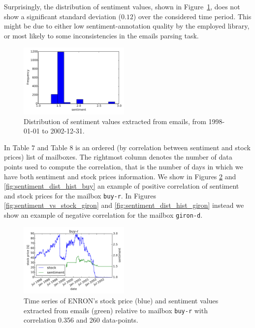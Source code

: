 \documentclass{vldb}
\begin{document}
Surprisingly, the distribution of sentiment values, shown in Figure~\ref{fig:sentiment_dist_hist}, does not show a significant standard deviation ($0.12$) over the considered time period.
This might be due to either low sentiment-annotation quality by the employed library, or most likely to some inconsistencies in the emails parsing task.

\begin{figure}[h!]
\centering
\includegraphics[width=0.48\textwidth]{imgs/sentiment_vs_stock_overall_hist.pdf}
\caption{Distribution of sentiment values extracted from emails, from 1998-01-01 to 2002-12-31.}
\label{fig:sentiment_dist_hist}
\end{figure}

In Table $7$ and Table $8$ is an ordered (by correlation between sentiment and
stock prices) list of mailboxes. The rightmost column denotes the number of
data points used to compute the correlation, that is the number of days in which
we have both sentiment and stock prices information.
We show in Figures \ref{fig:sentiment_vs_stock_buy} and
\ref{fig:sentiment_dist_hist_buy} an example of positive correlation of
sentiment and stock prices for the mailbox \texttt{buy-r}. In Figures
\ref{fig:sentiment_vs_stock_giron} and \ref{fig:sentiment_dist_hist_giron}
instead we show an example of negative correlation for the mailbox
\texttt{giron-d}.

\begin{figure}[h!]
\centering
\includegraphics[width=0.48\textwidth]{imgs/sentiment_vs_stock_buy-r.pdf}
\caption{Time series of ENRON's stock price (blue) and sentiment values
	extracted from emails (green) relative to mailbox \texttt{buy-r} with
correlation 0.356 and 260 data-points.}
\label{fig:sentiment_vs_stock_buy}
\end{figure}
\end{document}
